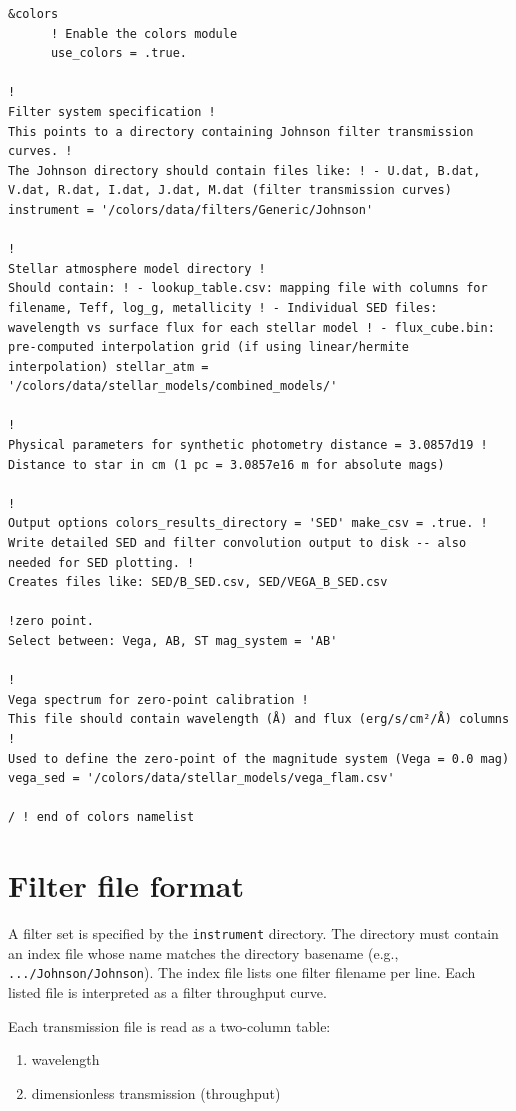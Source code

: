 \documentclass[linenumbers,apj,twocolumn, floatfix]{aastex701} \usepackage{amsmath} \usepackage{longtable} \usepackage{graphicx} \usepackage{ulem} \usepackage{xcolor} \usepackage{lettrine} \usepackage{yfonts} \usepackage{rotating}
\begin{document}
\begin{verbatim}
&colors
      ! Enable the colors module
      use_colors = .true.

!
Filter system specification !
This points to a directory containing Johnson filter transmission curves. !
The Johnson directory should contain files like: ! - U.dat, B.dat, V.dat, R.dat, I.dat, J.dat, M.dat (filter transmission curves) instrument = '/colors/data/filters/Generic/Johnson'

!
Stellar atmosphere model directory !
Should contain: ! - lookup_table.csv: mapping file with columns for filename, Teff, log_g, metallicity ! - Individual SED files: wavelength vs surface flux for each stellar model ! - flux_cube.bin: pre-computed interpolation grid (if using linear/hermite interpolation) stellar_atm = '/colors/data/stellar_models/combined_models/'

!
Physical parameters for synthetic photometry distance = 3.0857d19 !
Distance to star in cm (1 pc = 3.0857e16 m for absolute mags)

!
Output options colors_results_directory = 'SED' make_csv = .true. !
Write detailed SED and filter convolution output to disk -- also needed for SED plotting. !
Creates files like: SED/B_SED.csv, SED/VEGA_B_SED.csv

!zero point.
Select between: Vega, AB, ST mag_system = 'AB'

!
Vega spectrum for zero-point calibration !
This file should contain wavelength (Å) and flux (erg/s/cm²/Å) columns !
Used to define the zero-point of the magnitude system (Vega = 0.0 mag) vega_sed = '/colors/data/stellar_models/vega_flam.csv'

/ ! end of colors namelist
\end{verbatim}

\section{Filter file format}

A filter set is specified by the \texttt{instrument} directory.
The directory must contain an index file whose name matches the directory basename (e.g., \texttt{.../Johnson/Johnson}).
The index file lists one filter filename per line.
Each listed file is interpreted as a filter throughput curve.

Each transmission file is read as a two-column table:
\begin{enumerate}
  \item wavelength
  \item dimensionless transmission (throughput)
\end{enumerate}
\end{document}
